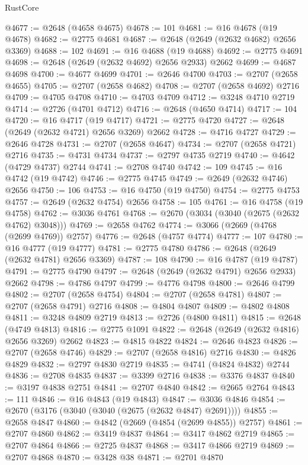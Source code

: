 \begin{lexlean}{RustCore}
\begin{coremodule}
@4677 := @2648 (@4658 @4675)
@4678 := 101
@4681 := @16 @4678 (@19 @4678)
@4682 := @2775 @4681
@4687 := @2648 (@2649 (@2632 @4682) @2656 @3369)
@4688 := 102
@4691 := @16 @4688 (@19 @4688)
@4692 := @2775 @4691
@4698 := @2648 (@2649 (@2632 @4692) @2656 @2933) @2662
@4699 := @4687 @4698
@4700 := @4677 @4699
@4701 := @2646 @4700
@4703 := @2707 (@2658 @4655)
@4705 := @2707 (@2658 @4682)
@4708 := @2707 (@2658 @4692) @2716
@4709 := @4705 @4708
@4710 := @4703 @4709
@4712 := @3248 @4710 @2719
@4714 := @2726 (@4701 @4712)
@4716 := @2648 (@4650 @4714)
@4717 := 104
@4720 := @16 @4717 (@19 @4717)
@4721 := @2775 @4720
@4727 := @2648 (@2649 (@2632 @4721) @2656 @3269) @2662
@4728 := @4716 @4727
@4729 := @2646 @4728
@4731 := @2707 (@2658 @4647)
@4734 := @2707 (@2658 @4721) @2716
@4735 := @4731 @4734
@4737 := @2797 @4735 @2719
@4740 := @4642 (@4729 @4737) @2744
@4741 := @2708 @4740
@4742 := 109
@4745 := @16 @4742 (@19 @4742)
@4746 := @2775 @4745
@4749 := @2649 (@2632 @4746) @2656
@4750 := 106
@4753 := @16 @4750 (@19 @4750)
@4754 := @2775 @4753
@4757 := @2649 (@2632 @4754) @2656
@4758 := 105
@4761 := @16 @4758 (@19 @4758)
@4762 := @3036 @4761
@4768 := @2670 (@3034 (@3040 (@2675 (@2632 @4762) @3048)))
@4769 := @2658 @4762
@4774 := @3066 (@2669 (@4768 (@2699 @4769)) @2757)
@4776 := @2648 (@4757 @4774)
@4777 := 107
@4780 := @16 @4777 (@19 @4777)
@4781 := @2775 @4780
@4786 := @2648 (@2649 (@2632 @4781) @2656 @3369)
@4787 := 108
@4790 := @16 @4787 (@19 @4787)
@4791 := @2775 @4790
@4797 := @2648 (@2649 (@2632 @4791) @2656 @2933) @2662
@4798 := @4786 @4797
@4799 := @4776 @4798
@4800 := @2646 @4799
@4802 := @2707 (@2658 @4754)
@4804 := @2707 (@2658 @4781)
@4807 := @2707 (@2658 @4791) @2716
@4808 := @4804 @4807
@4809 := @4802 @4808
@4811 := @3248 @4809 @2719
@4813 := @2726 (@4800 @4811)
@4815 := @2648 (@4749 @4813)
@4816 := @2775 @1091
@4822 := @2648 (@2649 (@2632 @4816) @2656 @3269) @2662
@4823 := @4815 @4822
@4824 := @2646 @4823
@4826 := @2707 (@2658 @4746)
@4829 := @2707 (@2658 @4816) @2716
@4830 := @4826 @4829
@4832 := @2797 @4830 @2719
@4835 := @4741 (@4824 @4832) @2744
@4836 := @2708 @4835
@4837 := @3399 @2716
@4838 := @3376 @4837
@4840 := @3197 @4838 @2751
@4841 := @2707 @4840
@4842 := @2665 @2764
@4843 := 111
@4846 := @16 @4843 (@19 @4843)
@4847 := @3036 @4846
@4854 := @2670 (@3176 (@3040 (@3040 (@2675 (@2632 @4847) @2691))))
@4855 := @2658 @4847
@4860 := @4842 (@2669 (@4854 (@2699 @4855)) @2757)
@4861 := @2707 @4860
@4862 := @3419 @4837
@4864 := @3417 @4862 @2719
@4865 := @2707 @4864
@4866 := @2725 @4837
@4868 := @3417 @4866 @2719
@4869 := @2707 @4868
@4870 := @3428 @38
@4871 := @2701 @4870

\end{coremodule}
\end{lexlean}
